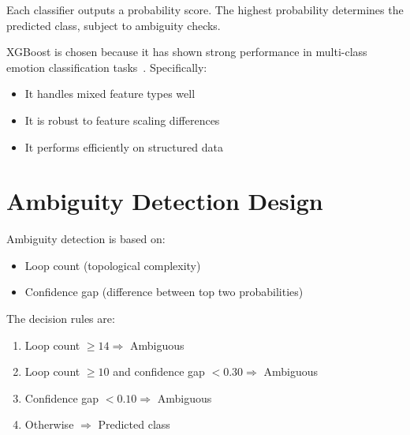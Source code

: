 Each classifier outputs a probability score. The highest probability determines the predicted
class, subject to ambiguity checks.

XGBoost is chosen because it has shown strong performance in multi-class emotion
classification tasks~\cite{xgboost_emotion}. Specifically:
\begin{itemize}
    \item It handles mixed feature types well
    \item It is robust to feature scaling differences
    \item It performs efficiently on structured data
\end{itemize}

\section{Ambiguity Detection Design}

Ambiguity detection is based on:
\begin{itemize}
    \item Loop count (topological complexity)
    \item Confidence gap (difference between top two probabilities)
\end{itemize}

The decision rules are:
\begin{enumerate}
    \item Loop count $\geq 14 \Rightarrow$ Ambiguous
    \item Loop count $\geq 10$ and confidence gap $< 0.30 \Rightarrow$ Ambiguous
    \item Confidence gap $< 0.10 \Rightarrow$ Ambiguous
    \item Otherwise $\Rightarrow$ Predicted class
\end{enumerate}

